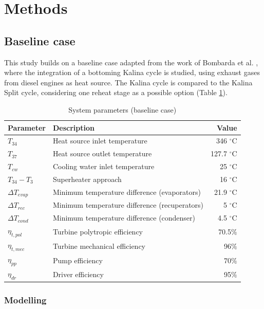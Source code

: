 \documentclass[final,times,3p]{elsarticle}
\begin{document}
\section{Methods}
\label{sec:methods}

\subsection{Baseline case}

This study builds on a baseline case adapted from the work of Bombarda et al. \cite{Bombarda2010b}, where the integration of a bottoming Kalina cycle is studied, using exhaust gases from diesel engines as heat source. The Kalina cycle is compared to the Kalina Split cycle, considering one reheat stage as a possible option (Table \ref{tab:system_baseline}).

\begin{table}[htbp]
\scriptsize
  \centering
  \caption{System parameters (baseline case)}
    \begin{tabular}{llr}
    \toprule
    Parameter & Description  & Value \\
    \midrule
     $T_{34}$ & Heat source inlet temperature & 346 $^{\circ}$C \\
     $T_{37}$     & Heat source outlet temperature & 127.7 $^{\circ}$C\\
     $T_{cw}$    & Cooling water inlet temperature & 25 $^{\circ}$C\\
     $T_{34}-T_{3}$  & Superheater approach & 16 $^{\circ}$C\\
     $\Delta T_{evap}$     & Minimum temperature difference (evaporators) & 21.9 $^{\circ}$C \\
     $\Delta T_{rec}$    & Minimum temperature difference (recuperators) & 5 $^{\circ}$C \\
     $\Delta T_{cond}$   & Minimum temperature difference (condenser) & 4.5 $^{\circ}$C \\
     $\eta_{t,pol}$    & Turbine polytropic efficiency & 70.5$\%$\\
     $\eta_{t,mec}$    & Turbine mechanical efficiency & 96$\%$\\
     $\eta_{pp}$    & Pump efficiency & 70$\%$\\
     $\eta_{dr}$  & Driver efficiency & 95$\%$\\
    \bottomrule
    \end{tabular}%
  \label{tab:system_baseline}%
\end{table}

\subsubsection{Modelling}
\end{document}
